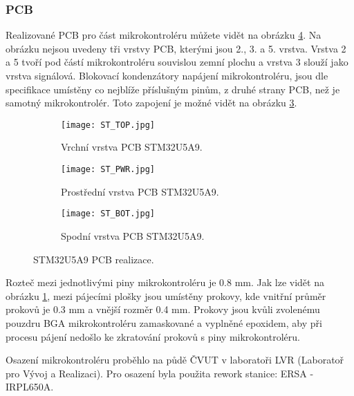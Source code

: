 	\subsubsection{PCB}
	Realizované PCB pro část mikrokontroléru můžete vidět na obrázku \ref{fig:ST_layout}. Na obrázku nejsou uvedeny tři vrstvy PCB, kterými jsou 2., 3. a 5. vrstva. Vrstva 2 a 5 tvoří pod částí mikrokontroléru souvislou zemní plochu a vrstva 3 slouží jako vrstva signálová. Blokovací kondenzátory napájení mikrokontroléru, jsou dle specifikace \cite{STM32U5A9_RM} umístěny co nejblíže příslušným pinům, z druhé strany PCB, než je samotný mikrokontrolér. Toto zapojení je možné vidět na obrázku \ref{fig:ST_BOT}. 
	\begin{figure}[h!]
		\centering
		\captionsetup{justification=centering}
		\begin{subfigure}[b]{0.3\textwidth}
			\centering
			\texttt{[image: ST\_TOP.jpg]}
			\caption{Vrchní vrstva PCB STM32U5A9.}
			\label{fig:ST_TOP}
		\end{subfigure}
		\hfill
		\begin{subfigure}[b]{0.3\textwidth}
			\centering
				\texttt{[image: ST\_PWR.jpg]}
			\caption{Prostřední vrstva PCB STM32U5A9.}
			\label{fig:ST_PWR}
		\end{subfigure}
		\hfill
		\begin{subfigure}[b]{0.3\textwidth}
			\centering
				\texttt{[image: ST\_BOT.jpg]}
			\caption{Spodní vrstva PCB STM32U5A9.}
			\label{fig:ST_BOT}
		\end{subfigure}
		\caption{STM32U5A9 PCB realizace.}
		\label{fig:ST_layout}
	\end{figure}
	Rozteč mezi jednotlivými piny mikrokontroléru je 0.8 mm. Jak lze vidět na obrázku \ref{fig:ST_TOP}, mezi pájecími plošky jsou umístěny prokovy, kde vnitřní průměr prokovů je 0.3 mm a vnější rozměr 0.4 mm. Prokovy jsou kvůli zvolenému pouzdru BGA mikrokontroléru zamaskované a vyplněné epoxidem, aby při procesu pájení nedošlo ke zkratování prokovů s piny mikrokontroléru.
	\par Osazení mikrokontroléru proběhlo na půdě ČVUT v laboratoři LVR (Laboratoř pro Vývoj a Realizaci). Pro osazení byla použita rework stanice: ERSA - IRPL650A.
	
